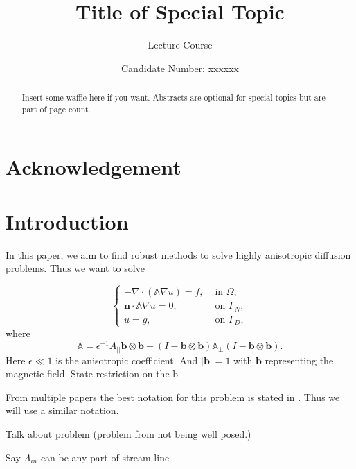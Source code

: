 \documentclass[12pt,a4paper]{article}
\title{Title of Special Topic}
\author{Lecture Course}
\date{Candidate Number: xxxxxx}
\begin{document}
\maketitle

\thispagestyle{empty}

\newpage
\setcounter{page}{1}

\section*{Acknowledgement}

\newpage

\begin{abstract}
  Insert some waffle here if you want. Abstracts are optional for
  special topics but are part of page count.
\end{abstract}

\newpage

\section{Introduction}
In this paper, we aim to find robust methods to solve highly anisotropic diffusion problems. Thus we want to solve

\begin{equation}
\begin{cases}
-\nabla \cdot (\mathbb{A}\nabla u) = f, & \text{ in }\Omega,\\
\mathbf{n}\cdot \mathbb{A}\nabla u = 0, & \text{ on }\Gamma_N, \\
u = g, & \text{  on }\Gamma_D,
\end{cases}
\end{equation}
where
\begin{equation}
\mathbb{A} = \epsilon^{-1} A_{||}\mathbf{b}\otimes \mathbf{b}
+(I - \mathbf{b}\otimes \mathbf{b})\mathbb{A}_{\perp}
(I - \mathbf{b}\otimes \mathbf{b}).
\end{equation}
    Here $\epsilon \ll 1$ is the anisotropic coefficient. And $|\mathbf{b}|=1$ with $\mathbf{b}$ representing the magnetic field.
State restriction on the b

From multiple papers the best notation for this problem is stated in \cite{} \cite{}. Thus we will use a similar notation. 

Talk about problem (problem from not being well posed.)

Say $\Lambda_{in}$ can be any part of stream line
\end{document}
